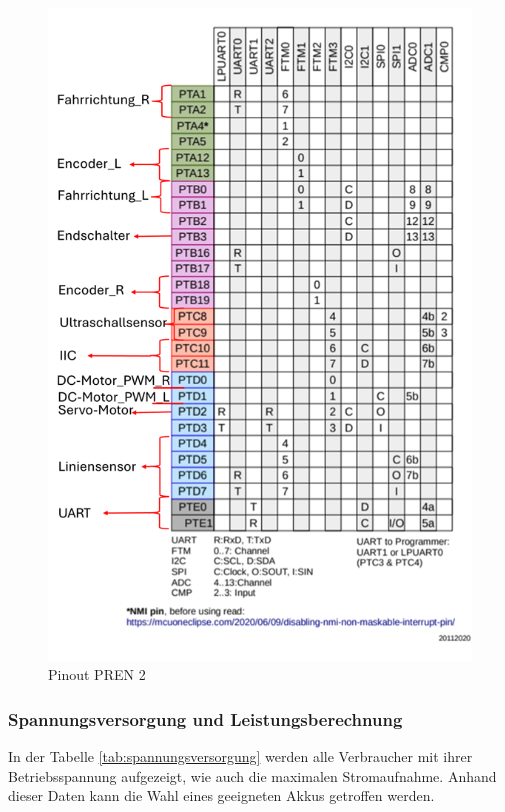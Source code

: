 \begin{figure}[H]
\begin{minipage}[b]{0.45\textwidth}
  \includegraphics[width=\textwidth]{assets/ET/PINOUT/Pinout_PREN2.png}
  \caption{Pinout PREN 2}
  \label{fig:Pinout PREN 2}
\end{minipage}
\end{figure}





\subsubsection{Spannungsversorgung und Leistungsberechnung}


In der Tabelle \ref{tab:spannungsversorgung} werden alle Verbraucher mit ihrer Betriebsspannung aufgezeigt, wie auch die maximalen Stromaufnahme. Anhand dieser Daten kann die Wahl eines geeigneten Akkus getroffen werden.


